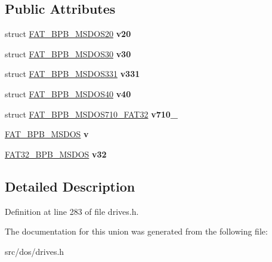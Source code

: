 \subsection*{Public Attributes}
\begin{DoxyCompactItemize}
\item 
\hypertarget{unionbpb__union__t_ab1a6ef6df0867946388e40fe41d108e6}{struct \hyperlink{structFAT__BPB__MSDOS20}{F\-A\-T\-\_\-\-B\-P\-B\-\_\-\-M\-S\-D\-O\-S20} {\bfseries v20}}\label{unionbpb__union__t_ab1a6ef6df0867946388e40fe41d108e6}

\item 
\hypertarget{unionbpb__union__t_a11523ee3aba98bfe68f5c944b9cfc0cd}{struct \hyperlink{structFAT__BPB__MSDOS30}{F\-A\-T\-\_\-\-B\-P\-B\-\_\-\-M\-S\-D\-O\-S30} {\bfseries v30}}\label{unionbpb__union__t_a11523ee3aba98bfe68f5c944b9cfc0cd}

\item 
\hypertarget{unionbpb__union__t_a5572d0d4a2da47745674cc5ee3b74bf8}{struct \hyperlink{structFAT__BPB__MSDOS331}{F\-A\-T\-\_\-\-B\-P\-B\-\_\-\-M\-S\-D\-O\-S331} {\bfseries v331}}\label{unionbpb__union__t_a5572d0d4a2da47745674cc5ee3b74bf8}

\item 
\hypertarget{unionbpb__union__t_afe33511f0b5a6396e3b400c485383e0d}{struct \hyperlink{structFAT__BPB__MSDOS40}{F\-A\-T\-\_\-\-B\-P\-B\-\_\-\-M\-S\-D\-O\-S40} {\bfseries v40}}\label{unionbpb__union__t_afe33511f0b5a6396e3b400c485383e0d}

\item 
\hypertarget{unionbpb__union__t_a20fb87c35374b2b95d121d5415b36064}{struct \hyperlink{structFAT__BPB__MSDOS710__FAT32}{F\-A\-T\-\_\-\-B\-P\-B\-\_\-\-M\-S\-D\-O\-S710\-\_\-\-F\-A\-T32} {\bfseries v710\-\_}}\label{unionbpb__union__t_a20fb87c35374b2b95d121d5415b36064}

\item 
\hypertarget{unionbpb__union__t_a90815a5608b52e8e9a5b519da5dd1026}{\hyperlink{structFAT__BPB__MSDOS40}{F\-A\-T\-\_\-\-B\-P\-B\-\_\-\-M\-S\-D\-O\-S} {\bfseries v}}\label{unionbpb__union__t_a90815a5608b52e8e9a5b519da5dd1026}

\item 
\hypertarget{unionbpb__union__t_a23790ee1c14527f691a4a106d2d5bf5f}{\hyperlink{structFAT__BPB__MSDOS710__FAT32}{F\-A\-T32\-\_\-\-B\-P\-B\-\_\-\-M\-S\-D\-O\-S} {\bfseries v32}}\label{unionbpb__union__t_a23790ee1c14527f691a4a106d2d5bf5f}

\end{DoxyCompactItemize}


\subsection{Detailed Description}


Definition at line 283 of file drives.\-h.



The documentation for this union was generated from the following file\-:\begin{DoxyCompactItemize}
\item 
src/dos/drives.\-h\end{DoxyCompactItemize}
